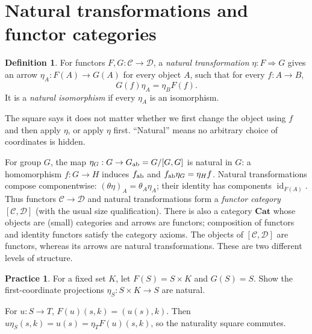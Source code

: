 \documentclass[11pt,openany]{book}
\newcommand{\id}{\operatorname{id}}\newcommand{\Sym}{\operatorname{Sym}}
\theoremstyle{definition}
\newtheorem{definition}[theorem]{Definition}
\newtheorem{exercise}[theorem]{Practice}
\begin{document}
\section{Natural transformations and functor categories}
\begin{definition}For functors $F,G:\mathcal C\to\mathcal D$, a \emph{natural transformation} $\eta:F\Rightarrow G$ gives an arrow $\eta_A:F(A)\to G(A)$ for every object $A$, such that for every $f:A\to B$,
\[G(f)\eta_A=\eta_BF(f).\]
It is a \emph{natural isomorphism} if every $\eta_A$ is an isomorphism.\end{definition}
\begin{intuition}The square says it does not matter whether we first change the object using $f$ and then apply $\eta$, or apply $\eta$ first. ``Natural'' means no arbitrary choice of coordinates is hidden.\end{intuition}
For group $G$, the map $\eta_G:G\to G_{\rm ab}=G/[G,G]$ is natural in $G$: a homomorphism $f:G\to H$ induces $f_{\rm ab}$ and $f_{\rm ab}\eta_G=\eta_Hf$. Natural transformations compose componentwise: $(\theta\eta)_A=\theta_A\eta_A$; their identity has components $\id_{F(A)}$. Thus functors $\mathcal C\to\mathcal D$ and natural transformations form a \emph{functor category} $[\mathcal C,\mathcal D]$ (with the usual size qualification).
There is also a category $\mathbf{Cat}$ whose objects are (small) categories and arrows are functors; composition of functors and identity functors satisfy the category axioms. The objects of $[\mathcal C,\mathcal D]$ are functors, whereas its arrows are natural transformations. These are two different levels of structure.
\begin{exercise}For a fixed set $K$, let $F(S)=S\times K$ and $G(S)=S$. Show the first-coordinate projections $\eta_S:S\times K\to S$ are natural.\end{exercise}
\begin{solution}For $u:S\to T$, $F(u)(s,k)=(u(s),k)$. Then $u\eta_S(s,k)=u(s)=\eta_TF(u)(s,k)$, so the naturality square commutes.\end{solution}
\end{document}
